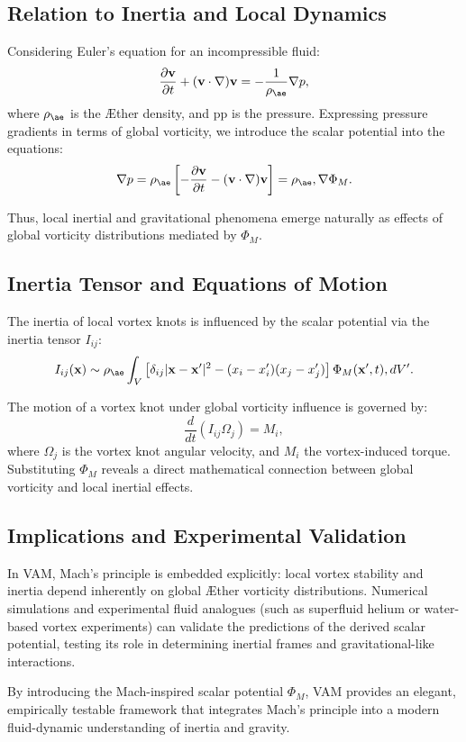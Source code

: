 \subsection{Relation to Inertia and Local Dynamics}
Considering Euler's equation for an incompressible fluid:
\begin{equation}
    \frac{\partial \mathbf{v}}{\partial t}+(\mathbf{v}\cdot \nabla)\mathbf{v}=-\frac{1}{\rho_{\ae}}\nabla p,
\end{equation}
where $\rho_{\ae}$ is the Æther density, and pp is the pressure. Expressing pressure gradients in terms of global vorticity, we introduce the scalar potential into the equations:
\begin{equation}
    \nabla p = \rho_{\ae}\left[-\frac{\partial\mathbf{v}}{\partial t} - (\mathbf{v}\cdot\nabla)\mathbf{v}\right] = \rho_{\ae}, \nabla \Phi_M.
\end{equation}


Thus, local inertial and gravitational phenomena emerge naturally as effects of global vorticity distributions mediated by $\Phi_M$.


\subsection{Inertia Tensor and Equations of Motion}
The inertia of local vortex knots is influenced by the scalar potential via the inertia tensor $I_{ij}$:
\begin{equation}
    I_{ij}(\mathbf{x}) \sim \rho_{\ae}\int_V \left[\delta_{ij}|\mathbf{x}-\mathbf{x}'|^2 - (x_i - x'_i)(x_j - x'_j)\right]\Phi_M(\mathbf{x}',t), dV'.
\end{equation}


The motion of a vortex knot under global vorticity influence is governed by:
\begin{equation}
    \frac{d}{dt}(I_{ij}\Omega_j) = M_i,
\end{equation}
where $\Omega_j$ is the vortex knot angular velocity, and $M_i$ the vortex-induced torque. Substituting $\Phi_M$ reveals a direct mathematical connection between global vorticity and local inertial effects.


\subsection{Implications and Experimental Validation}
In VAM, Mach's principle is embedded explicitly: local vortex stability and inertia depend inherently on global Æther vorticity distributions. Numerical simulations and experimental fluid analogues (such as superfluid helium or water-based vortex experiments) can validate the predictions of the derived scalar potential, testing its role in determining inertial frames and gravitational-like interactions.


By introducing the Mach-inspired scalar potential $\Phi_M$, VAM provides an elegant, empirically testable framework that integrates Mach's principle into a modern fluid-dynamic understanding of inertia and gravity.